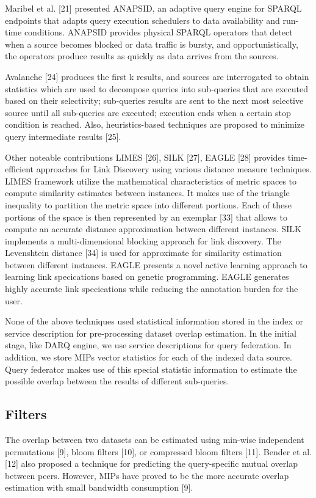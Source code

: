 \documentclass{sig-alternate}  %
\begin{document}
Maribel et al. {[}21{]} presented ANAPSID, an adaptive query engine
for SPARQL endpoints that adapts query execution schedulers to data
availability and run-time conditions. ANAPSID provides physical SPARQL
operators that detect when a source becomes blocked or data traffic
is bursty, and opportunistically, the operators produce results as
quickly as data arrives from the sources. 

Avalanche {[}24{]} produces the first k results, and sources are interrogated
to obtain statistics which are used to decompose queries into sub-queries
that are executed based on their selectivity; sub-queries results
are sent to the next most selective source until all sub-queries are
executed; execution ends when a certain stop condition is reached.
Also, heuristics-based techniques are proposed to minimize query intermediate
results {[}25{]}. 

Other noteable contributions LIMES {[}26{]}, SILK {[}27{]}, EAGLE
{[}28{]} provides time-efficient approaches for Link Discovery using
various distance measure techniques. LIMES framework utilize the mathematical
characteristics of metric spaces to compute similarity estimates between
instances. It makes use of the triangle inequality to partition the
metric space into different portions. Each of these portions of the
space is then represented by an exemplar {[}33{]} that allows to compute
an accurate distance approximation between different instances. SILK
implements a multi-dimensional blocking approach for link discovery.
The Levenshtein distance {[}34{]} is used for approximate for similarity
estimation between different instances. EAGLE presents a novel active
learning approach to learning link specications based on genetic programming.
EAGLE generates highly accurate link specications while reducing the
annotation burden for the user. 

None of the above techniques used statistical information stored in
the index or service description for pre-processing dataset overlap
estimation. In the initial stage, like DARQ engine, we use service
descriptions for query federation. In addition, we store MIPs vector
statistics for each of the indexed data source. Query federator makes
use of this special statistic information to estimate the possible
overlap between the results of different sub-queries.

\subsection{Filters}
The overlap between two datasets can be estimated using min-wise independent
permutations {[}9{]}, bloom filters {[}10{]}, or compressed bloom
filters {[}11{]}. Bender et al. {[}12{]} also proposed a technique
for predicting the query-specific mutual overlap between peers. However,
MIPs have proved to be the more accurate overlap estimation with small
bandwidth consumption {[}9{]}.
\end{document}
